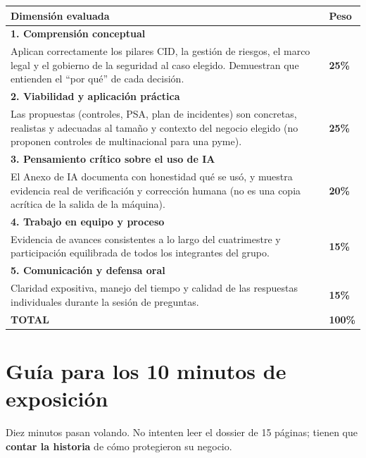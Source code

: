 \documentclass[12pt,a4paper]{article}
\renewcommand{\arraystretch}{1.25}
\begin{document}
\renewcommand{\arraystretch}{1.5}
\begin{tabularx}{\textwidth}{|X|>{\centering\arraybackslash}p{1.5cm}|}
\hline
\rowcolor{doradoFinal!20}
\textbf{Dimensi\'on evaluada} & \textbf{Peso} \\
\hline
\textbf{1. Comprensi\'on conceptual}\\
Aplican correctamente los pilares CID, la gesti\'on de riesgos, el marco legal y el gobierno de la seguridad al caso elegido. Demuestran que entienden el ``por qu\'e'' de cada decisi\'on. & \textbf{25\%} \\
\hline
\textbf{2. Viabilidad y aplicaci\'on pr\'actica}\\
Las propuestas (controles, PSA, plan de incidentes) son concretas, realistas y adecuadas al tama\~no y contexto del negocio elegido (no proponen controles de multinacional para una pyme). & \textbf{25\%} \\
\hline
\textbf{3. Pensamiento cr\'itico sobre el uso de IA}\\
El Anexo de IA documenta con honestidad qu\'e se us\'o, y muestra evidencia real de verificaci\'on y correcci\'on humana (no es una copia acr\'itica de la salida de la m\'aquina). & \textbf{20\%} \\
\hline
\textbf{4. Trabajo en equipo y proceso}\\
Evidencia de avances consistentes a lo largo del cuatrimestre y participaci\'on equilibrada de todos los integrantes del grupo. & \textbf{15\%} \\
\hline
\textbf{5. Comunicaci\'on y defensa oral}\\
Claridad expositiva, manejo del tiempo y calidad de las respuestas individuales durante la sesi\'on de preguntas. & \textbf{15\%} \\
\hline
\rowcolor{grisClaro}
\textbf{TOTAL} & \textbf{100\%} \\
\hline
\end{tabularx}

\newpage
\section{Gu\'ia para los 10 minutos de exposici\'on}

Diez minutos pasan volando. No intenten leer el dossier de 15 p\'aginas; tienen que \textbf{contar la historia} de c\'omo protegieron su negocio.
\end{document}
